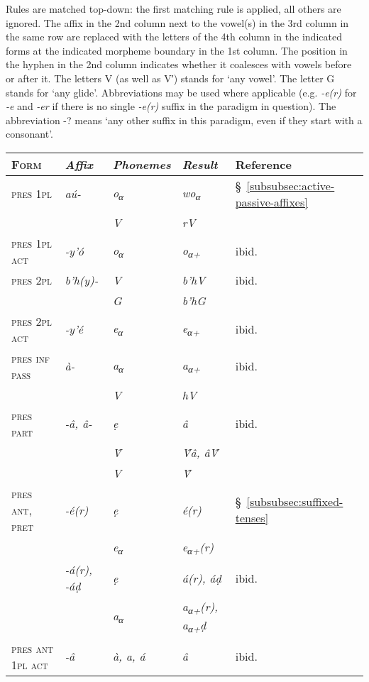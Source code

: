 \documentclass[a4paper, 12pt, twoside, final]{article}
\let \nf \normalfont
\let \w \textit
\let \Sub \textsubscript
\begin{document}
Rules are matched top-down: the first matching rule is applied, all others are ignored. The affix in the 2nd column next to the
vowel(s) in the 3rd column in the same row are replaced with the letters of the 4th column in the indicated forms at the
indicated morpheme boundary in the 1st column. The position in the hyphen in the 2nd column indicates whether it coalesces
with vowels before or after it. The letters V (as well as V′) stands for ‘any vowel’. The letter G stands for
‘any glide’. Abbreviations may be used where applicable (e.g. \w{-e(r)} for \w{-e} and \w{-er} if there is no single \w{-e(r)}
suffix in the paradigm in question). The abbreviation -? means ‘any other suffix in this paradigm, even if they
start with a consonant’.

\medskip
{\centering
\noindent
\begin{longtable}{@{}>{\scshape}l|>{\it}p{5em}|>{\it}l|>{\it}l|l}
\nf Form    & \nf Affix & \nf Phonemes & \nf Result & Reference \\\hline\hline
pres 1pl          & aú-     & o\Sub α  & wo\Sub α & §~\ref{subsubsec:active-passive-affixes} \\
                  &         &\nf V & r\nf V \\\hline
pres 1pl act      & -y’ó    & o\Sub α  & o\Sub{α+} &ibid. \\\hline
pres 2pl          & b’h(y)- &\nf V & b’h\nf V &ibid. \\
                  &         &\nf G & b’h\nf G \\\hline
pres 2pl act      & -y’é    & e\Sub α  & e\Sub{α+} &ibid.\\\hline
pres inf pass     & à-      & a\Sub α& a\Sub {α+}&ibid. \\
                  &         &\nf V & h\nf V \\\hline
pres part         & -â, â-  & ẹ & â &ibid. \\
                  &         &\nf V̂ & {\nf V̂}â, â{\nf V̂} \\
                  &         &\nf V &\nf V̂ \\\hline\hline
pres ant, pret    & -é(r)   & ẹ & é(r) &§~\ref{subsubsec:suffixed-tenses}\\
                  &         &e\Sub α & e\Sub{α+}(r) \\
                  & -á(r), -áḍ  & ẹ & á(r), áḍ &ibid. \\
                  &         &a\Sub α & a\Sub{α+}(r), a\Sub{α+}ḍ \\\hline
pres ant 1pl act  & -â      &à, a, á & â & ibid.\\\hline\hline

\end{longtable}}
\end{document}
